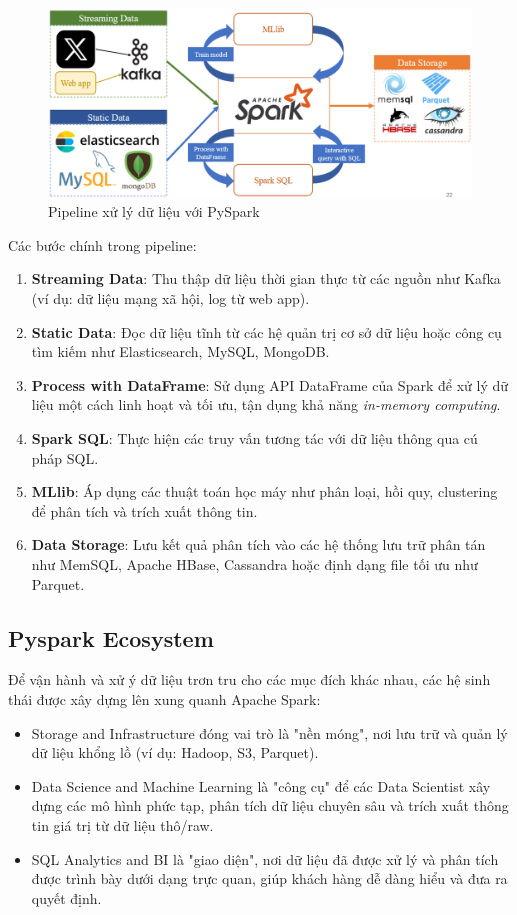 \documentclass[11pt]{article}
\begin{document}
\begin{figure}[H]
    \centering
    \includegraphics[width=0.9\linewidth]{PySpark_pipeline.png}
    \caption{Pipeline xử lý dữ liệu với PySpark}
    \label{fig:pyspark-pipeline}
\end{figure}

\noindent Các bước chính trong pipeline:
\begin{enumerate}
    \item \textbf{Streaming Data}: Thu thập dữ liệu thời gian thực từ các nguồn như Kafka (ví dụ: dữ liệu mạng xã hội, log từ web app).
    \item \textbf{Static Data}: Đọc dữ liệu tĩnh từ các hệ quản trị cơ sở dữ liệu hoặc công cụ tìm kiếm như Elasticsearch, MySQL, MongoDB.
    \item \textbf{Process with DataFrame}: Sử dụng API DataFrame của Spark để xử lý dữ liệu một cách linh hoạt và tối ưu, tận dụng khả năng \textit{in-memory computing}.
    \item \textbf{Spark SQL}: Thực hiện các truy vấn tương tác với dữ liệu thông qua cú pháp SQL.
    \item \textbf{MLlib}: Áp dụng các thuật toán học máy như phân loại, hồi quy, clustering để phân tích và trích xuất thông tin.
    \item \textbf{Data Storage}: Lưu kết quả phân tích vào các hệ thống lưu trữ phân tán như MemSQL, Apache HBase, Cassandra hoặc định dạng file tối ưu như Parquet.
\end{enumerate}




\subsection{Pyspark Ecosystem}
Để vận hành và xử ý dữ liệu trơn tru cho các mục đích khác nhau, các hệ sinh thái được xây dựng lên xung quanh Apache Spark:
\begin{itemize}
\item Storage and Infrastructure đóng vai trò là "nền móng", nơi lưu trữ và quản lý dữ liệu khổng lồ (ví dụ: Hadoop, S3, Parquet).
\item Data Science and Machine Learning là "công cụ" để các Data Scientist xây dựng các mô hình phức tạp, phân tích dữ liệu chuyên sâu và trích xuất thông tin giá trị từ dữ liệu thô/raw.
\item SQL Analytics and BI là "giao diện", nơi dữ liệu đã được xử lý và phân tích được trình bày dưới dạng trực quan, giúp khách hàng dễ dàng hiểu và đưa ra quyết định. \\
\end{itemize}
\end{document}
